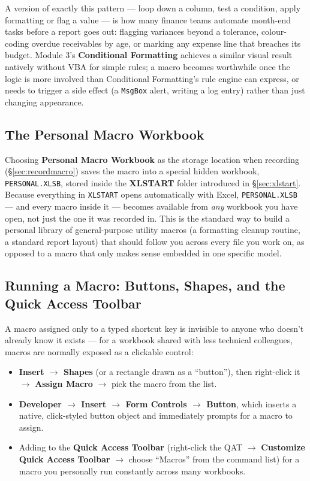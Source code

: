 \documentclass[11pt,a4paper]{article}
\begin{document}
\begin{financeapp}
A version of exactly this pattern --- loop down a column, test a condition, apply formatting or flag a value --- is how many finance teams automate month-end tasks before a report goes out: flagging variances beyond a tolerance, colour-coding overdue receivables by age, or marking any expense line that breaches its budget. Module 3's \textbf{Conditional Formatting} achieves a similar visual result natively without VBA for simple rules; a macro becomes worthwhile once the logic is more involved than Conditional Formatting's rule engine can express, or needs to trigger a side effect (a \texttt{MsgBox} alert, writing a log entry) rather than just changing appearance.
\end{financeapp}

\subsection{The Personal Macro Workbook}
\label{sec:personalmacro}

Choosing \textbf{Personal Macro Workbook} as the storage location when recording (\S\ref{sec:recordmacro}) saves the macro into a special hidden workbook, \texttt{PERSONAL.XLSB}, stored inside the \textbf{XLSTART} folder introduced in \S\ref{sec:xlstart}. Because everything in \texttt{XLSTART} opens automatically with Excel, \texttt{PERSONAL.XLSB} --- and every macro inside it --- becomes available from \emph{any} workbook you have open, not just the one it was recorded in. This is the standard way to build a personal library of general-purpose utility macros (a formatting cleanup routine, a standard report layout) that should follow you across every file you work on, as opposed to a macro that only makes sense embedded in one specific model.

\subsection{Running a Macro: Buttons, Shapes, and the Quick Access Toolbar}

A macro assigned only to a typed shortcut key is invisible to anyone who doesn't already know it exists --- for a workbook shared with less technical colleagues, macros are normally exposed as a clickable control:

\begin{itemize}
  \item \textbf{Insert $\rightarrow$ Shapes} (or a rectangle drawn as a ``button''), then right-click it $\rightarrow$ \textbf{Assign Macro} $\rightarrow$ pick the macro from the list.
  \item \textbf{Developer $\rightarrow$ Insert $\rightarrow$ Form Controls $\rightarrow$ Button}, which inserts a native, click-styled button object and immediately prompts for a macro to assign.
  \item Adding to the \textbf{Quick Access Toolbar} (right-click the QAT $\rightarrow$ \textbf{Customize Quick Access Toolbar} $\rightarrow$ choose ``Macros'' from the command list) for a macro you personally run constantly across many workbooks.
\end{itemize}
\end{document}
